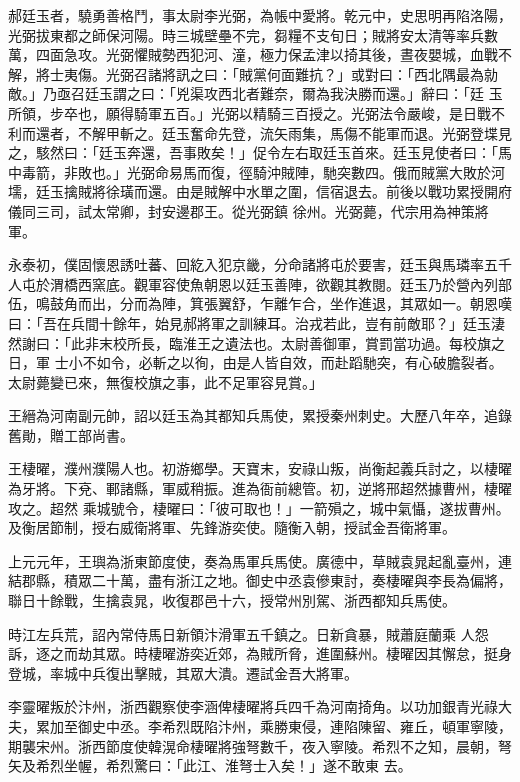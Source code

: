 \begin{pinyinscope}
 郝廷玉者，驍勇善格鬥，事太尉李光弼，為帳中愛將。乾元中，史思明再陷洛陽，光弼拔東都之師保河陽。時三城壁壘不完，芻糧不支旬日；賊將安太清等率兵數萬，四面急攻。光弼懼賊勢西犯河、潼，極力保孟津以掎其後，晝夜嬰城，血戰不解，將士夷傷。光弼召諸將訊之曰：「賊黨何面難抗？」或對曰：「西北隅最為勍敵。」乃亟召廷玉謂之曰：「兇渠攻西北者難奈，爾為我決勝而還。」辭曰：「廷
 玉所領，步卒也，願得騎軍五百。」光弼以精騎三百授之。光弼法令嚴峻，是日戰不利而還者，不解甲斬之。廷玉奮命先登，流矢雨集，馬傷不能軍而退。光弼登堞見之，駭然曰：「廷玉奔還，吾事敗矣！」促令左右取廷玉首來。廷玉見使者曰：「馬中毒箭，非敗也。」光弼命易馬而復，徑騎沖賊陣，馳突數四。俄而賊黨大敗於河壖，廷玉擒賊將徐璜而還。由是賊解中水單之圍，信宿退去。前後以戰功累授開府儀同三司，試太常卿，封安邊郡王。從光弼鎮
 徐州。光弼薨，代宗用為神策將軍。



 永泰初，僕固懷恩誘吐蕃、回紇入犯京畿，分命諸將屯於要害，廷玉與馬璘率五千人屯於渭橋西窯底。觀軍容使魚朝恩以廷玉善陣，欲觀其教閱。廷玉乃於營內列部伍，鳴鼓角而出，分而為陣，箕張翼舒，乍離乍合，坐作進退，其眾如一。朝恩嘆曰：「吾在兵間十餘年，始見郝將軍之訓練耳。治戎若此，豈有前敵耶？」廷玉淒然謝曰：「此非末校所長，臨淮王之遺法也。太尉善御軍，賞罰當功過。每校旗之日，軍
 士小不如令，必斬之以徇，由是人皆自效，而赴蹈馳突，有心破膽裂者。太尉薨變已來，無復校旗之事，此不足軍容見賞。」



 王縉為河南副元帥，詔以廷玉為其都知兵馬使，累授秦州刺史。大歷八年卒，追錄舊勛，贈工部尚書。



 王棲曜，濮州濮陽人也。初游鄉學。天寶末，安祿山叛，尚衡起義兵討之，以棲曜為牙將。下兗、鄆諸縣，軍威稍振。進為衙前總管。初，逆將邢超然據曹州，棲曜攻之。超然
 乘城號令，棲曜曰：「彼可取也！」一箭殞之，城中氣懾，遂拔曹州。及衡居節制，授右威衛將軍、先鋒游奕使。隨衡入朝，授試金吾衛將軍。



 上元元年，王璵為浙東節度使，奏為馬軍兵馬使。廣德中，草賊袁晁起亂臺州，連結郡縣，積眾二十萬，盡有浙江之地。御史中丞袁傪東討，奏棲曜與李長為偏將，聯日十餘戰，生擒袁晁，收復郡邑十六，授常州別駕、浙西都知兵馬使。



 時江左兵荒，詔內常侍馬日新領汴滑軍五千鎮之。日新貪暴，賊蕭庭蘭乘
 人怨訴，逐之而劫其眾。時棲曜游奕近郊，為賊所脅，進圍蘇州。棲曜因其懈怠，挺身登城，率城中兵復出擊賊，其眾大潰。遷試金吾大將軍。



 李靈曜叛於汴州，浙西觀察使李涵俾棲曜將兵四千為河南掎角。以功加銀青光祿大夫，累加至御史中丞。李希烈既陷汴州，乘勝東侵，連陷陳留、雍丘，頓軍寧陵，期襲宋州。浙西節度使韓滉命棲曜將強弩數千，夜入寧陵。希烈不之知，晨朝，弩矢及希烈坐幄，希烈驚曰：「此江、淮弩士入矣！」遂不敢東
 去。




\end{pinyinscope}
